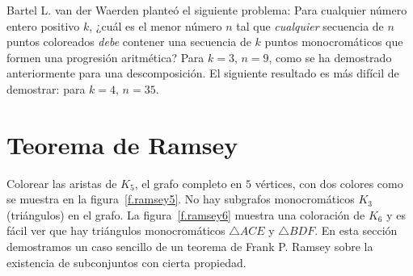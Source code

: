 Bartel L. van der Waerden planteó el siguiente problema: Para cualquier número entero positivo $k$, ¿cuál es el menor número $n$ tal que \emph{cualquier} secuencia de $n$ puntos coloreados \emph{debe} contener una secuencia de $k$ puntos monocromáticos que formen una progresión aritmética? Para $k=3$, $n=9$, como se ha demostrado anteriormente para una descomposición. El siguiente resultado es más difícil de demostrar: para $k=4$, $n=35$.


\section{Teorema de Ramsey}\label{s.ramsey}

Colorear las aristas de $K_5$, el grafo completo en $5$ vértices, con dos colores como se muestra en la figura~\ref{f.ramsey5}. No hay subgrafos monocromáticos $K_3$ (triángulos) en el grafo. La figura~\ref{f.ramsey6} muestra una coloración de $K_6$ y es fácil ver que hay triángulos monocromáticos $\triangle ACE$ y $\triangle BDF$. En esta sección demostramos un caso sencillo de un teorema de Frank P. Ramsey sobre la existencia de subconjuntos con cierta propiedad.
